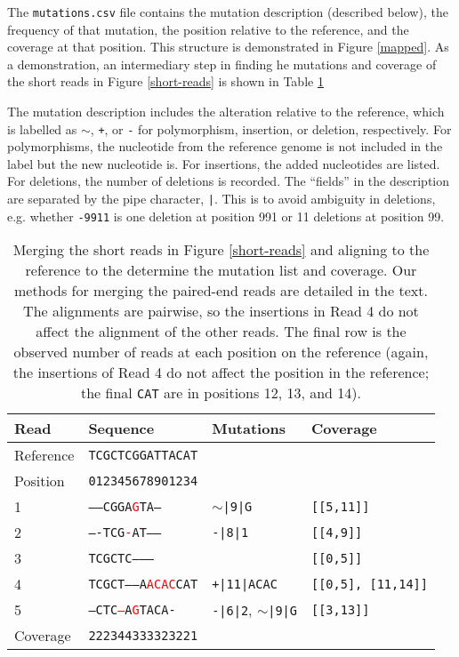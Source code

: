 \documentclass{article}
\begin{document}
The \texttt{mutations.csv} file contains the mutation description (described below), the frequency of that mutation, the position relative to the reference, and the coverage at that position.
This structure is demonstrated in Figure \ref{mapped}.
As a demonstration, an intermediary step in finding he mutations and coverage of the short reads in Figure \ref{short-reads} is shown in Table \ref{aligned}


The mutation description includes the alteration relative to the reference, which is labelled as \texttt{$\sim$}, \texttt{+}, or \texttt{-} for polymorphism, insertion, or deletion, respectively.
For polymorphisms, the nucleotide from the reference genome is not included in the label but the new nucleotide is.
For insertions, the added nucleotides are listed.
For deletions, the number of deletions is recorded.
The ``fields'' in the description are separated by the pipe character, \texttt{|}.
This is to avoid ambiguity in deletions, e.g. whether \texttt{-9911} is one deletion at position 991 or 11 deletions at position 99.

\begin{table}[h!]
\begin{tabular}{llll}
Read & Sequence & Mutations & Coverage \\\hline
Reference & \texttt{TCGCTCGGATTACAT} &  &  \\
Position & \texttt{012345678901234} && \\\hline
1         & \texttt{-----CGGA\textcolor{red}{G}TA---} & \texttt{$\sim$|9|G} & \texttt{[[5,11]]}\\
2         & \texttt{----TCG\textcolor{red}{-}AT-----} & \texttt{-|8|1} & \texttt{[[4,9]]}\\
3         & \texttt{TCGCTC---------} & & \texttt{[[0,5]]}\\
4         & \texttt{TCGCT------A\textcolor{red}{ACAC}CAT} & \texttt{+|11|ACAC} & \texttt{[[0,5], [11,14]]}\\
5         & \texttt{---CTC\textcolor{red}{--}A\textcolor{red}{G}TACA-} & \texttt{-|6|2}, \texttt{$\sim$|9|G}& \texttt{[[3,13]]}\\\hline
Coverage & \texttt{222344333323221} &&
\end{tabular}
\caption{Merging the short reads in Figure \ref{short-reads} and aligning to the reference to the determine the mutation list and coverage.
Our methods for merging the paired-end reads are detailed in the text.
The alignments are pairwise, so the insertions in Read 4 do not affect the alignment of the other reads.
The final row is the observed number of reads at each position on the reference (again, the insertions of Read 4 do not affect the position in the reference; the final \texttt{CAT} are in positions 12, 13, and 14).}
\label{aligned}
\end{table}
\end{document}
